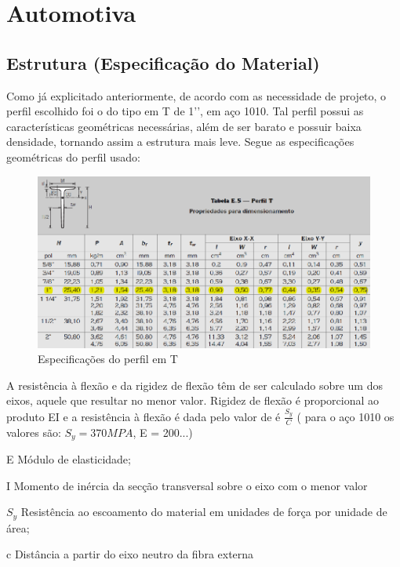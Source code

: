 \chapter[Automotiva]{Automotiva}
\label{cha:automotiva_desenvolvimento}

\section{Estrutura (Especificação do Material)}
Como já explicitado anteriormente, de acordo com as necessidade de projeto, o perfil escolhido foi o do tipo em T de 1’’, em aço 1010. Tal perfil possui as características geométricas necessárias, além de ser barato e possuir baixa densidade, tornando assim a estrutura mais leve. Segue as especificações geométricas do perfil usado:

\begin{figure}[h]
	\centering
	\includegraphics[scale=0.7]{figuras/perfil_t.png}
	\caption{Especificações do perfil em T}
\end{figure}

A resistência à flexão e da rigidez de flexão têm de ser calculado sobre um dos eixos, aquele que resultar no menor valor. Rigidez de flexão é proporcional ao produto EI e a resistência à flexão é dada pelo valor de é $\frac{S_{y}}{C}$ ( para o aço 1010 os valores são: $S_{y} = 370MPA$, E = 200...)

\begin{description}
	\item E Módulo de elasticidade;
	\item I Momento de inércia da secção transversal sobre o eixo com o menor valor
	\item $S_y$ Resistência ao escoamento do material em unidades de força por unidade de área;
	\item c Distância a partir do eixo neutro da fibra externa
\end{description}

